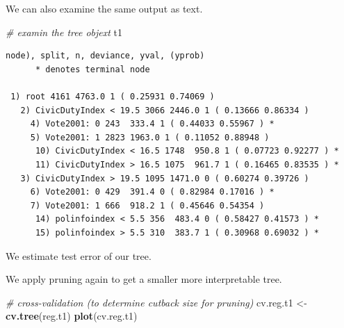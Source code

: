 \documentclass[]{article}
\newenvironment{Shaded}{\begin{snugshade}}{\end{snugshade}}
\newcommand{\CommentTok}[1]{\textcolor[rgb]{0.56,0.35,0.01}{\textit{#1}}}
\newcommand{\DataTypeTok}[1]{\textcolor[rgb]{0.13,0.29,0.53}{#1}}
\newcommand{\DecValTok}[1]{\textcolor[rgb]{0.00,0.00,0.81}{#1}}
\newcommand{\KeywordTok}[1]{\textcolor[rgb]{0.13,0.29,0.53}{\textbf{#1}}}
\newcommand{\NormalTok}[1]{#1}
\newcommand{\OperatorTok}[1]{\textcolor[rgb]{0.81,0.36,0.00}{\textbf{#1}}}
\newcommand{\OtherTok}[1]{\textcolor[rgb]{0.56,0.35,0.01}{#1}}
\newcommand{\StringTok}[1]{\textcolor[rgb]{0.31,0.60,0.02}{#1}}
\begin{document}
We can also examine the same output as text.

\begin{Shaded}
\begin{Highlighting}[]
\CommentTok{# examin the tree objext}
\NormalTok{t1}
\end{Highlighting}
\end{Shaded}

\begin{verbatim}
node), split, n, deviance, yval, (yprob)
      * denotes terminal node

 1) root 4161 4763.0 1 ( 0.25931 0.74069 )  
   2) CivicDutyIndex < 19.5 3066 2446.0 1 ( 0.13666 0.86334 )  
     4) Vote2001: 0 243  333.4 1 ( 0.44033 0.55967 ) *
     5) Vote2001: 1 2823 1963.0 1 ( 0.11052 0.88948 )  
      10) CivicDutyIndex < 16.5 1748  950.8 1 ( 0.07723 0.92277 ) *
      11) CivicDutyIndex > 16.5 1075  961.7 1 ( 0.16465 0.83535 ) *
   3) CivicDutyIndex > 19.5 1095 1471.0 0 ( 0.60274 0.39726 )  
     6) Vote2001: 0 429  391.4 0 ( 0.82984 0.17016 ) *
     7) Vote2001: 1 666  918.2 1 ( 0.45646 0.54354 )  
      14) polinfoindex < 5.5 356  483.4 0 ( 0.58427 0.41573 ) *
      15) polinfoindex > 5.5 310  383.7 1 ( 0.30968 0.69032 ) *
\end{verbatim}

We estimate test error of our tree.

\begin{Shaded}
\end{Shaded}

We apply pruning again to get a smaller more interpretable tree.

\begin{Shaded}
\begin{Highlighting}[]
\CommentTok{# cross-validation (to determine cutback size for pruning)}
\NormalTok{cv.reg.t1 <-}\StringTok{ }\KeywordTok{cv.tree}\NormalTok{(reg.t1)}
\KeywordTok{plot}\NormalTok{(cv.reg.t1)}
\end{Highlighting}
\end{Shaded}
\end{document}
